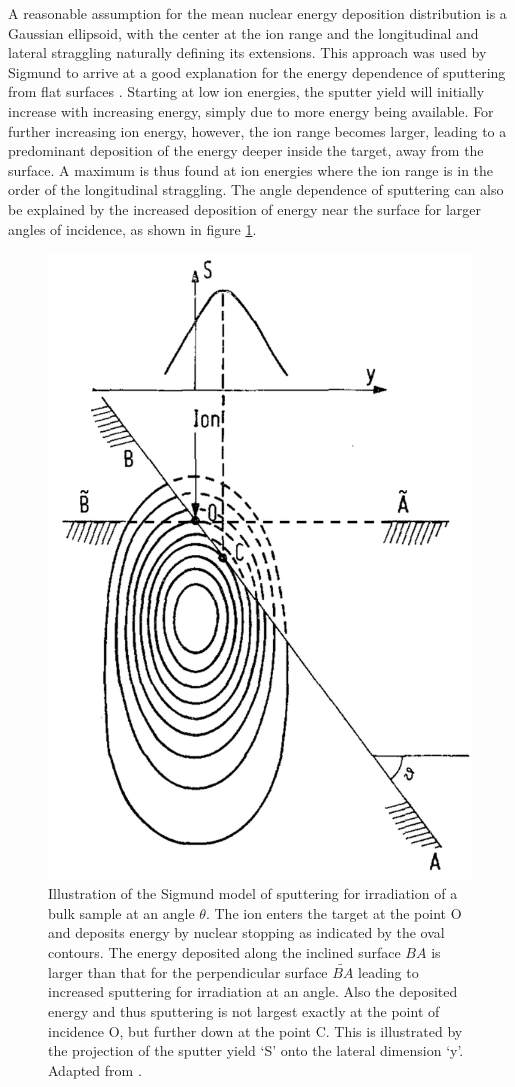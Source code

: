 A reasonable assumption for the mean nuclear energy deposition distribution is a Gaussian ellipsoid, with the center at the ion range and the longitudinal and lateral straggling naturally defining its extensions. This approach was used by Sigmund to arrive at a good explanation for the energy dependence of sputtering from flat surfaces \cite{sigmund_theory_1969}. Starting at low ion energies, the sputter yield will initially increase with increasing energy, simply due to more energy being available. For further increasing ion energy, however, the ion range becomes larger, leading to a predominant deposition of the energy deeper inside the target, away from the surface. A maximum is thus found at ion energies where the ion range is in the order of the longitudinal straggling. The angle dependence of sputtering can also be explained by the increased deposition of energy near the surface for larger angles of incidence, as shown in figure \ref{anglesigmund}.

\begin{figure}
	\centering
		\includegraphics[width=.45\textwidth]{images/anglesigmund.jpg}
	\caption{Illustration of the Sigmund model of sputtering for irradiation of a bulk sample at an angle $\theta$. The ion enters the target at the point O and deposits energy by nuclear stopping as indicated by the oval contours. The energy deposited along the inclined surface $BA$ is larger than that for the perpendicular surface $\widetilde{BA}$ leading to increased sputtering for irradiation at an angle. Also the deposited energy and thus sputtering is not largest exactly at the point of incidence O, but further down at the point C. This is illustrated by the projection of the sputter yield `S' onto the lateral dimension `y'. Adapted from \cite{sigmund_mechanism_1973}.}
	\label{anglesigmund}
\end{figure} 

